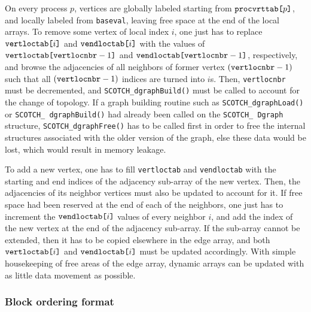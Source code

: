 On every process $p$, vertices are globally labeled starting from
${\tt proc\lbt vrt\lbt tab}\mbox{\tt [}p\mbox{\tt ]}$, and locally
labeled from {\tt baseval}, leaving free space at the end of the local
arrays. To remove some vertex of local index $i$, one just has to
replace $\mbox{\tt vert\lbt loc\lbt tab}\mbox{\tt [}i\mbox{\tt ]}$ and
${\tt vend\lbt loc\lbt tab}\mbox{\tt [}i\mbox{\tt ]}$ with the values
of ${\tt vert\lbt loc\lbt tab}\lbt \mbox{\tt [vert\lbt loc\lbt
nbr}-1\mbox{\tt ]}$ and ${\tt vend\lbt loc\lbt tab}\lbt \mbox{\tt
[vert\lbt loc\lbt nbr}-1\mbox{\tt ]}$, respectively, and browse the
adjacencies of all neighbors of former vertex $(\mbox{\tt
vert}\lbt\mbox{\tt loc}\lbt\mbox{\tt nbr}-1)$ such that all
$(\mbox{\tt vert}\lbt\mbox{\tt loc}\lbt\mbox{\tt nbr}-1)$ indices are
turned into $i$s. Then, {\tt vert\lbt loc\lbt nbr} must be
decremented, and {\tt SCOTCH\_\lbt dgraph\lbt Build()} must be called
to account for the change of topology. If a graph building routine
such as {\tt SCOTCH\_\lbt dgraph\lbt Load()} or {\tt SCOTCH\_\lbt
dgraph\lbt Build()} had already been called on the {\tt SCOTCH\_\lbt
Dgraph} structure, {\tt SCOTCH\_\lbt dgraph\lbt Free()} has to be
called first in order to free the internal structures associated with
the older version of the graph, else these data would be lost, which
would result in memory leakage.

To add a new vertex, one has to fill {\tt vert\lbt loc\lbt tab} and {\tt vend\lbt loc\lbt tab}
with the starting and end indices of the adjacency sub-array of the
new vertex. Then, the adjacencies of its neighbor vertices must also
be updated to account for it. If free space had been reserved at the
end of each of the neighbors, one just has to increment the
${\tt vend\lbt loc\lbt tab}\mbox{\tt [}i\mbox{\tt ]}$ values of every
neighbor $i$, and add the index of the new vertex at the end of the
adjacency sub-array. If the sub-array cannot be extended, then it has
to be copied elsewhere in the edge array, and both ${\tt vert\lbt
loc\lbt tab}\mbox{\tt [}i\mbox{\tt ]}$ and ${\tt vend\lbt loc\lbt
tab}\mbox{\tt [}i\mbox{\tt ]}$ must be updated accordingly. With
simple housekeeping of free areas of the edge array, dynamic arrays
can be updated with as little data movement as possible.

\subsubsection{Block ordering format}
\label{sec-lib-format-order}

